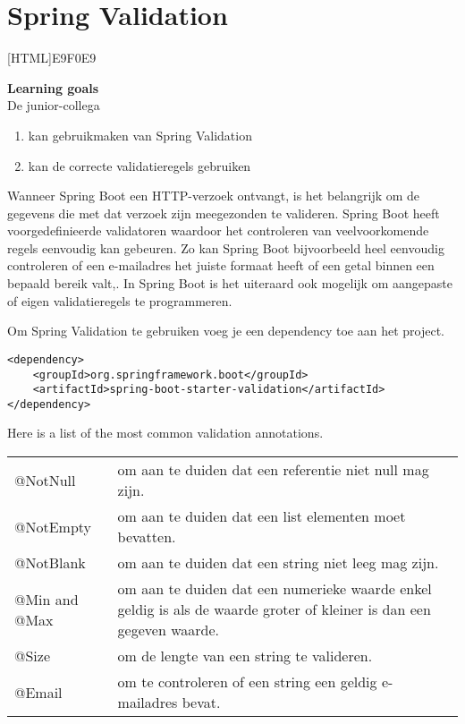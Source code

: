 \chapter{Spring Validation}
    
[HTML]{E9F0E9}{\parbox{\textwidth}{%
\noindent \textbf{Learning goals}\\
De junior-collega
\begin{enumerate}[nolistsep]
\item kan gebruikmaken van Spring Validation
\item kan de correcte validatieregels gebruiken
\end{enumerate}}}

Wanneer Spring Boot een HTTP-verzoek ontvangt, is het belangrijk om de gegevens die met dat verzoek zijn meegezonden te valideren.  Spring Boot heeft voorgedefinieerde validatoren waardoor het controleren van veelvoorkomende regels eenvoudig kan gebeuren.  Zo kan Spring Boot bijvoorbeeld heel eenvoudig controleren of een e-mailadres het juiste formaat heeft of een getal binnen een bepaald bereik valt,.
In Spring Boot is het uiteraard ook mogelijk om aangepaste of eigen validatieregels te programmeren.

Om Spring Validation te gebruiken voeg je een dependency toe aan het project.

\begin{lstlisting}
<dependency>
	<groupId>org.springframework.boot</groupId>
	<artifactId>spring-boot-starter-validation</artifactId>
</dependency>
\end{lstlisting}

Here is a list of the most common validation annotations.

\begin{tabularx}{\textwidth}{|l|X|}
\hline
@NotNull & om aan te duiden dat een referentie niet null mag zijn. \\
@NotEmpty & om aan te duiden dat een list elementen moet bevatten. \\
@NotBlank & om aan te duiden dat een string niet leeg mag zijn. \\
@Min and @Max & om aan te duiden dat een numerieke waarde enkel geldig is als de waarde groter of kleiner is dan een gegeven waarde.\\
@Size &  om de lengte van een string te valideren. \\
@Email & om te controleren of een string een geldig e-mailadres bevat.\\
\hline
\end{tabularx}

